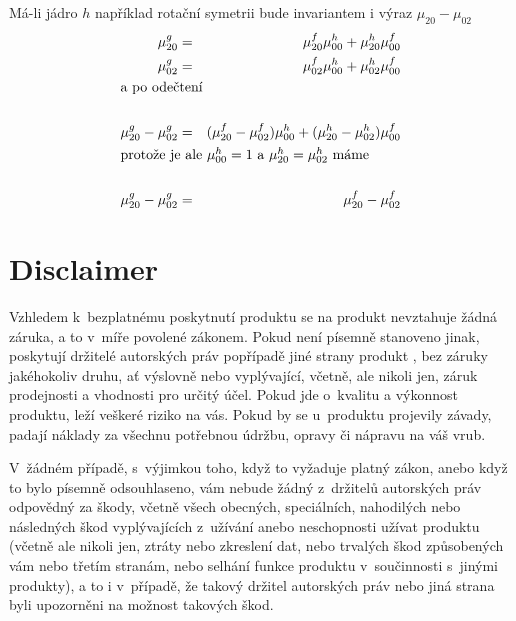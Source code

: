 Má-li jádro $h$ například rotační symetrii bude invariantem i výraz $\mu_{20}-\mu_{02}$ 
\begin{eqnarray}
\mu_{20}^g&=&\mu_{20}^f\mu_{00}^h+\mu_{20}^h\mu_{00}^f\\
\mu_{02}^g&=&\mu_{02}^f\mu_{00}^h+\mu_{02}^h\mu_{00}^f\\
\noalign{\hbox{a po odečtení}\nonumber}\\
\mu_{20}^g-\mu_{02}^g&=&(\mu_{20}^f-\mu_{02}^f)\mu_{00}^h+(\mu_{20}^h-\mu_{02}^h)\mu_{00}^f\\
\noalign{\hbox{protože je ale $\mu_{00}^h=1$ a $\mu_{20}^h=\mu_{02}^h$ máme}\nonumber}\\
\mu_{20}^g-\mu_{02}^g&=&\mu_{20}^f-\mu_{02}^f
\end{eqnarray}

\section*{Disclaimer}
{
\sc
Vzhledem k~bezplatnému poskytnutí produktu se na produkt
nevztahuje žádná záruka, a to v~míře povolené zákonem. Pokud není
písemně stanoveno jinak, poskytují držitelé autorských práv popřípadě
jiné strany produkt , bez záruky jakéhokoliv druhu, ať
výslovně nebo vyplývající, včetně, ale nikoli jen, záruk prodejnosti
a vhodnosti pro určitý účel. Pokud jde o~kvalitu a výkonnost produktu,
leží veškeré riziko na vás. Pokud by se u~produktu projevily závady,
padají náklady za všechnu potřebnou údržbu, opravy či nápravu na váš
vrub.

V~žádném případě, s~výjimkou toho, když to vyžaduje platný zákon, anebo
když to bylo písemně odsouhlaseno, vám nebude žádný z~držitelů
autorských práv odpovědný za škody,
včetně všech obecných, speciálních, nahodilých nebo následných škod
vyplývajících z~užívání anebo neschopnosti užívat produktu (včetně ale
nikoli jen, ztráty nebo zkreslení dat, nebo trvalých škod způsobených
vám nebo třetím stranám, nebo selhání funkce produktu v~součinnosti
s~jinými produkty), a to i v~případě, že takový držitel autorských práv
nebo jiná strana byli upozorněni na možnost takových škod.
}

